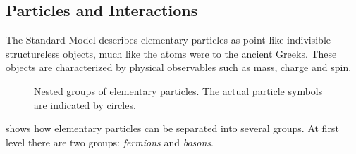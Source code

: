 \subsection{Particles and Interactions}
The Standard Model describes elementary particles as point-like indivisible structureless objects, much like the atoms were to the ancient Greeks. These objects are characterized by physical observables such as mass, charge and spin.

\begin{figure}
    \centering
    \caption{Nested groups of elementary particles. The actual particle symbols are indicated by circles.}
    \label{fig:particle_groups}
\end{figure}

 shows how elementary particles can be separated into several groups. 
At first level there are two groups: \emph{fermions} and \emph{bosons}.

